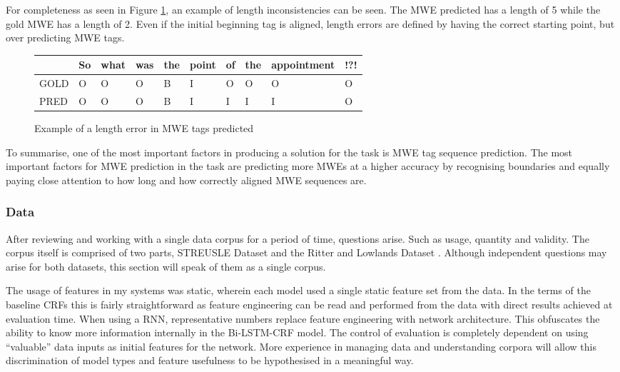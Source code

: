 For completeness as seen in Figure \ref{fig:lengtherrormwepred}, an example of length inconsistencies can be seen. The MWE predicted has a length of 5 while the gold MWE has a length of 2. Even if the initial beginning tag is aligned, length errors are defined by having the correct starting point, but over predicting MWE tags.

\begin{figure}[H]
    \centering
    \begin{tabular}{l|lllllllll}
           & So & what & was & the & point & of & the & appointment & !?!\\
      \hline
      \rowcolor{yellow!50}
      GOLD & O  & O    & O   & B   & I     & O  & O   & O           & O\\
      PRED & O  & O    & O   & B   & I     & I  & I   & I           & O\\
    \end{tabular}
  \caption{Example of a length error in MWE tags predicted}
  \label{fig:lengtherrormwepred}
\end{figure}

To summarise, one of the most important factors in producing a solution for the \dimsum task is MWE tag sequence prediction. The most important factors for MWE prediction in the \dimsum task are predicting more MWEs at a higher accuracy by recognising boundaries and equally paying close attention to how long and how correctly aligned MWE sequences are.

\subsubsection{Data}
After reviewing and working with a single data corpus for a period of time, questions arise. Such as usage, quantity and validity. The corpus itself is comprised of two parts, STREUSLE Dataset \cite{Schneider2014a} and the Ritter and Lowlands Dataset \cite{Johannsen:ea:14}. Although independent questions may arise for both datasets, this section will speak of them as a single corpus.

The usage of features in my systems was static, wherein each model used a single static feature set from the data. In the terms of the baseline CRFs this is fairly straightforward as feature engineering can be read and performed from the data with direct results achieved at evaluation time. When using a RNN, representative numbers replace feature engineering with network architecture. This obfuscates the ability to know more information internally in the Bi-LSTM-CRF model. The control of evaluation is completely dependent on using ``valuable'' data inputs as initial features for the network. More experience in managing data and understanding corpora will allow this discrimination of model types and feature usefulness to be hypothesised in a meaningful way.


